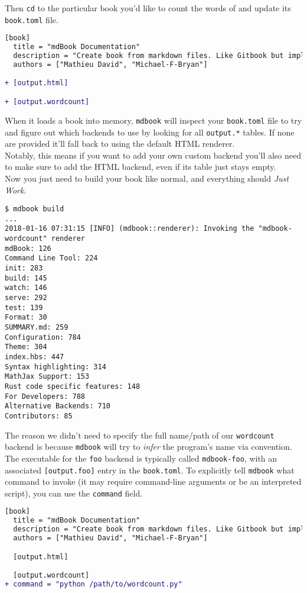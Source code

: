 \documentclass{article}
\begin{document}
Then \lstinline|cd| to the particular book you'd like to count the words of and update its
\lstinline|book.toml| file.\\
\begin{lstlisting}[language=diff]
  [book]
  title = "mdBook Documentation"
  description = "Create book from markdown files. Like Gitbook but implemented in Rust"
  authors = ["Mathieu David", "Michael-F-Bryan"]

+ [output.html]

+ [output.wordcount]

\end{lstlisting}

When it loads a book into memory, \lstinline|mdbook| will inspect your \lstinline|book.toml| file to
try and figure out which backends to use by looking for all \lstinline|output.*| tables.
If none are provided it'll fall back to using the default HTML renderer.\\

Notably, this means if you want to add your own custom backend you'll also need
to make sure to add the HTML backend, even if its table just stays empty.\\

Now you just need to build your book like normal, and everything should \emph{Just
Work}.\\
\begin{lstlisting}[language=shell]
$ mdbook build
...
2018-01-16 07:31:15 [INFO] (mdbook::renderer): Invoking the "mdbook-wordcount" renderer
mdBook: 126
Command Line Tool: 224
init: 283
build: 145
watch: 146
serve: 292
test: 139
Format: 30
SUMMARY.md: 259
Configuration: 784
Theme: 304
index.hbs: 447
Syntax highlighting: 314
MathJax Support: 153
Rust code specific features: 148
For Developers: 788
Alternative Backends: 710
Contributors: 85

\end{lstlisting}

The reason we didn't need to specify the full name/path of our \lstinline|wordcount|
backend is because \lstinline|mdbook| will try to \emph{infer} the program's name via
convention. The executable for the \lstinline|foo| backend is typically called
\lstinline|mdbook-foo|, with an associated \lstinline|[output.foo]| entry in the \lstinline|book.toml|. To
explicitly tell \lstinline|mdbook| what command to invoke (it may require command-line
arguments or be an interpreted script), you can use the \lstinline|command| field.\\
\begin{lstlisting}[language=diff]
  [book]
  title = "mdBook Documentation"
  description = "Create book from markdown files. Like Gitbook but implemented in Rust"
  authors = ["Mathieu David", "Michael-F-Bryan"]

  [output.html]

  [output.wordcount]
+ command = "python /path/to/wordcount.py"

\end{lstlisting}
\end{document}
